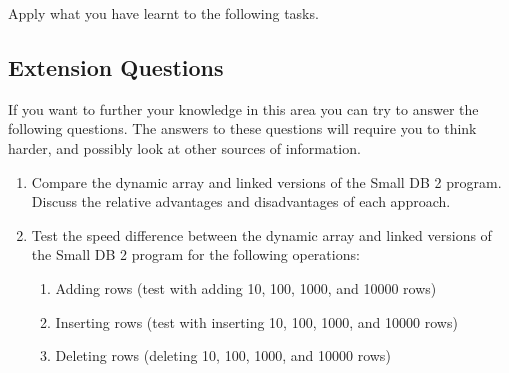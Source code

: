 Apply what you have learnt to the following tasks.


\subsection{Extension Questions} %
\label{sub:dynamic_memory_extension_questions}

If you want to further your knowledge in this area you can try to answer the following questions. The answers to these questions will require you to think harder, and possibly look at other sources of information.

\begin{enumerate}
  \item Compare the dynamic array and linked versions of the Small DB 2 program. Discuss the relative advantages and disadvantages of each approach.
  \item Test the speed difference between the dynamic array and linked versions of the Small DB 2 program for the following operations:
  \begin{enumerate}
    \item Adding rows (test with adding 10, 100, 1000, and 10000 rows)
    \item Inserting rows (test with inserting 10, 100, 1000, and 10000 rows)
    \item Deleting rows (deleting 10, 100, 1000, and 10000 rows)
  \end{enumerate}
\end{enumerate}

